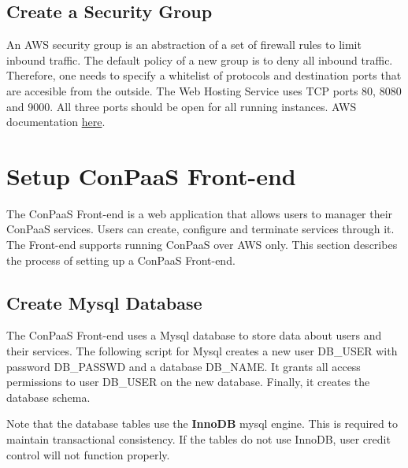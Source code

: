 \documentclass[12pt]{article}
\begin{document}
\subsection{Create a Security Group}
An AWS security group is an abstraction of a set of firewall rules to limit
inbound traffic. The default policy of a new group is to deny all inbound
traffic. Therefore, one needs to specify a whitelist of protocols and
destination ports that are accesible from the outside.
The Web Hosting Service uses TCP ports 80, 8080 and 9000. All three ports
should be open for all running instances.
AWS documentation \href{http://docs.amazonwebservices.com/AWSEC2/latest/UserGuide/index.html?using-network-security.html}{here}.


\section{Setup ConPaaS Front-end}
The ConPaaS Front-end is a web application that allows users to manager their
ConPaaS services. Users can create, configure and terminate services through
it. The Front-end supports running ConPaaS over AWS only. This section
describes the process of setting up a ConPaaS Front-end.

\subsection{Create Mysql Database}
The ConPaaS Front-end uses a Mysql database to store data about users and their
services. The following script for Mysql creates a new user DB\_USER with
password DB\_PASSWD and a database DB\_NAME. It grants all access permissions
to user DB\_USER on the new database. Finally, it creates the database schema.

Note that the database tables use the \textbf{InnoDB} mysql engine. This is
required to maintain transactional consistency. If the tables do not use
InnoDB, user credit control will not function properly.
\end{document}
